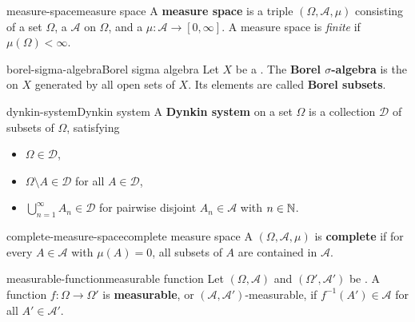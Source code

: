 \begin{topic}{measure-space}{measure space}
    A \textbf{measure space} is a triple $(\Omega, \mathcal{A}, \mu)$ consisting of a set $\Omega$, a  $\mathcal{A}$ on $\Omega$, and a  $\mu : \mathcal{A} \to [0, \infty]$. A measure space is \textit{finite} if $\mu(\Omega) < \infty$.
\end{topic}

\begin{topic}{borel-sigma-algebra}{Borel sigma algebra}
    Let $X$ be a . The \textbf{Borel $\sigma$-algebra} is the  on $X$ generated by all open sets of $X$. Its elements are called \textbf{Borel subsets}.
\end{topic}

\begin{topic}{dynkin-system}{Dynkin system}
    A \textbf{Dynkin system} on a set $\Omega$ is a collection $\mathcal{D}$ of subsets of $\Omega$, satisfying
    \begin{itemize}
        \item $\Omega \in \mathcal{D}$,
        \item $\Omega \setminus A \in \mathcal{D}$ for all $A \in \mathcal{D}$,
        \item $\bigcup_{n = 1}^\infty A_n \in \mathcal{D}$ for pairwise disjoint $A_n \in \mathcal{A}$ with $n \in \mathbb{N}$.
    \end{itemize}
\end{topic}

\begin{topic}{complete-measure-space}{complete measure space}
    A  $(\Omega, \mathcal{A}, \mu)$ is \textbf{complete} if for every $A \in \mathcal{A}$ with $\mu(A) = 0$, all subsets of $A$ are contained in $\mathcal{A}$.
\end{topic}

\begin{topic}{measurable-function}{measurable function}
    Let $(\Omega, \mathcal{A})$ and $(\Omega', \mathcal{A}')$ be . A function $f : \Omega \to \Omega'$ is \textbf{measurable}, or $(\mathcal{A}, \mathcal{A}')$-measurable, if $f^{-1}(A') \in \mathcal{A}$ for all $A' \in \mathcal{A}'$.
\end{topic}

